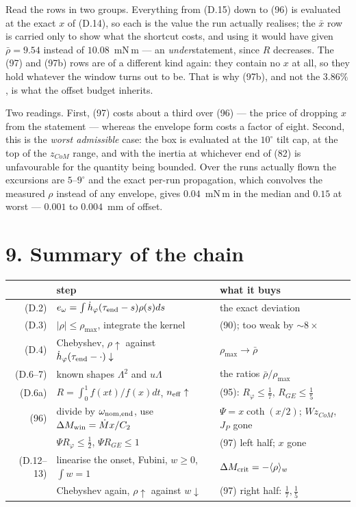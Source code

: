 \documentclass[11pt]{article}
\newcommand{\Wz}{W\!z_{CoM}}
\newcommand{\te}{\tau_{\rm end}}
\newcommand{\rmax}{\rho_{\max}}
\newcommand{\rbar}{\bar\rho}
\begin{document}
Read the rows in two groups. Everything from (D.15) down to (96) is
evaluated at the exact $x$ of (D.14), so each is the value the run
actually realises; the $\bar x$ row is carried only to show what the
shortcut costs, and using it would have given $\rbar = 9.54$ instead of
$10.08$~mN\,m --- an \emph{under}statement, since $R$ decreases. The
(97) and (97b) rows are of a different kind again: they contain no $x$
at all, so they hold whatever the window turns out to be. That is why
(97b), and not the $3.86\%$, is what the offset budget inherits.

Two readings. First, (97) costs about a third over (96) --- the price
of dropping $x$ from the statement --- whereas the envelope form costs
a factor of eight. Second, this is the \emph{worst admissible} case: the
box is evaluated at the $10^\circ$ tilt cap, at the top of the
$z_{CoM}$ range, and with the inertia at whichever end of (82) is
unfavourable for the quantity being bounded. Over the runs actually
flown the excursions are $5$--$9^\circ$ and the exact per-run
propagation, which convolves the measured $\rho$ instead of any
envelope, gives $0.04$~mN\,m in the median and $0.15$ at worst ---
$0.001$ to $0.004$~mm of offset.

\section*{9. Summary of the chain}

\begin{center}\small
\begin{tabular}{@{}rll@{}}
\toprule
& step & what it buys \\
\midrule
(D.2) & $e_\omega = \int\dot h_\varphi(\te-s)\rho(s)ds$
      & the exact deviation \\
(D.3) & $|\rho|\le\rmax$, integrate the kernel
      & (90); too weak by $\sim8\times$ \\
(D.4) & Chebyshev, $\rho\uparrow$ against $\dot h_\varphi(\te-\cdot)\downarrow$
      & $\rmax \to \rbar$ \\
(D.6--7) & known shapes $\Lambda^2$ and $u\Lambda$
      & the ratios $\rbar/\rmax$ \\
(D.6a) & $R = \int_0^1 f(xt)/f(x)dt$, $n_{\rm eff}\uparrow$
      & (95): $R_\varphi\le\tfrac17$, $R_{GE}\le\tfrac15$ \\
(96)  & divide by $\omega_{\rm nom,end}$, use $\Delta M_{\rm win}=\dot Mx/C_2$
      & $\Psi = x\coth(x/2)$; $\Wz$, $J_P$ gone \\
      & $\Psi R_\varphi\le\tfrac12$, $\Psi R_{GE}\le1$
      & (97) left half; $x$ gone \\
(D.12--13) & linearise the onset, Fubini, $w\ge0$, $\int w=1$
      & $\Delta M_{\rm crit} = -\langle\rho\rangle_w$ \\
      & Chebyshev again, $\rho\uparrow$ against $w\downarrow$
      & (97) right half: $\tfrac17,\tfrac15$ \\
\bottomrule
\end{tabular}
\end{center}
\end{document}
